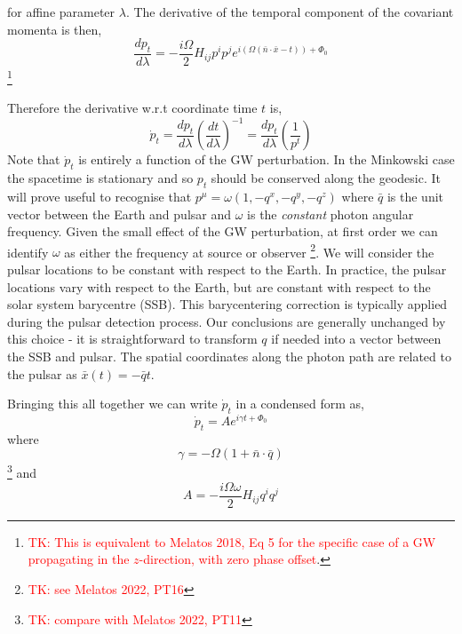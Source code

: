 \documentclass[fleqn,usenatbib,useAMS]{mnras}
\begin{document}
\noindent for affine parameter $\lambda$. The derivative of the temporal component of the covariant momenta is then,
\begin{equation}
	\frac{d p_{t}}{d \lambda} = -\frac{i\Omega}{2} H_{ij}p^i p^j  e^{i(\Omega(\bar{n}\cdot \bar{x} - t))+\Phi_0}
\end{equation}
\footnote{\textcolor{red}{TK: This is equivalent to Melatos 2018, Eq 5 for the specific case of a GW propagating in the $z$-direction, with zero phase offset}.}


\noindent Therefore the derivative w.r.t coordinate time $t$ is,
\begin{equation}
	\dot{p}_t = \frac{d p_{t}}{d \lambda} \left(\frac{dt}{d\lambda}\right)^{-1} = \frac{d p_{t}}{d \lambda} \left(\frac{1}{p^t}\right)
\end{equation}
\noindent Note that $\dot{p}_t$ is entirely a function of the GW perturbation. In the Minkowski case the spacetime is stationary and so $p_t$ should be conserved along the geodesic. It will prove useful to recognise that $p^{\mu} = \omega(1,-q^x,-q^y,-q^z)$ where $\bar{q}$ is the unit vector between the Earth and pulsar and $\omega$ is the \textit{constant} photon angular frequency. Given the small effect of the GW perturbation, at first order we can identify $\omega$ as either the frequency at source or observer \footnote{ \textcolor{red}{TK: see Melatos 2022, PT16}}. We will consider  the pulsar locations to be constant with respect to the Earth. In practice, the pulsar locations vary with respect to the Earth, but are constant with respect to the solar system barycentre (SSB). This barycentering correction is typically applied during the pulsar detection process. Our conclusions are generally unchanged by this choice - it is straightforward to transform $q$ if needed into a vector between the SSB and pulsar. The spatial coordinates along the photon path are related to the pulsar as $\bar{x}(t) = -\bar{q}t$. \newline  


\noindent Bringing this all together we can write $\dot{p}_t$ in a condensed form as,
\begin{equation}
	\dot{p}_t = A e^{i \gamma t + \Phi_0}
\end{equation}
where 
\begin{equation}
	\gamma = -\Omega (1 + \bar{n}\cdot \bar{q}) 
\end{equation}
\footnote{\textcolor{red}{TK: compare with Melatos 2022, PT11}}
\noindent and
\begin{equation}
	A = -\frac{i\Omega \omega}{2} H_{ij}q^i q^j 
\end{equation}
\end{document}
